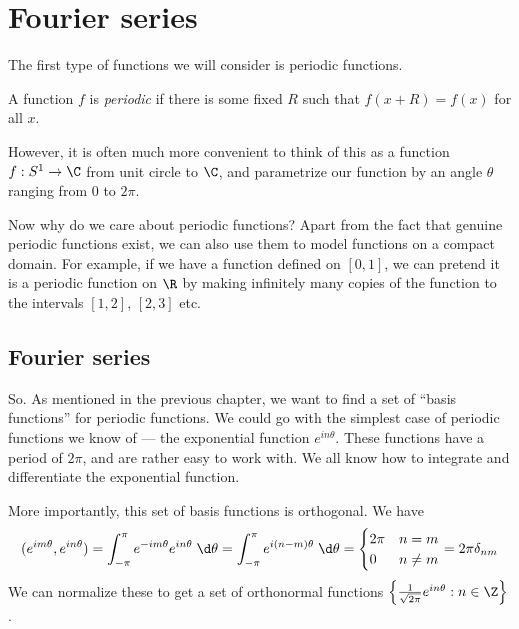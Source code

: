 \documentclass[a4paper]{article}
\begin{document}
\section{Fourier series}
The first type of functions we will consider is periodic functions.
\begin{defi}
  A function $f$ is \emph{periodic} if there is some fixed $R$ such that $f(x + R) = f(x)$ for all $x$.

  However, it is often much more convenient to think of this as a function $f: S^1 \to \C$ from unit circle to $\C$, and parametrize our function by an angle $\theta$ ranging from $0$ to $2\pi$.
\end{defi}
Now why do we care about periodic functions? Apart from the fact that genuine periodic functions exist, we can also use them to model functions on a compact domain. For example, if we have a function defined on $[0, 1]$, we can pretend it is a periodic function on $\R$ by making infinitely many copies of the function to the intervals $[1, 2]$, $[2, 3]$ etc.
\begin{center}
\end{center}
\subsection{Fourier series}
So. As mentioned in the previous chapter, we want to find a set of ``basis functions'' for periodic functions. We could go with the simplest case of periodic functions we know of --- the exponential function $e^{in\theta}$. These functions have a period of $2\pi$, and are rather easy to work with. We all know how to integrate and differentiate the exponential function.

More importantly, this set of basis functions is orthogonal. We have
\[
  (e^{im \theta}, e^{in\theta}) = \int_{-\pi}^{\pi} e^{-im\theta} e^{in\theta}\;\d \theta = \int_{-\pi}^\pi e^{i(n - m)\theta}\;\d \theta =
  \begin{cases}
    2\pi & n = m\\
    0 & n\not= m
  \end{cases} = 2\pi \delta_{nm}
\]
We can normalize these to get a set of orthonormal functions $\left\{\frac{1}{\sqrt{2\pi}} e^{in\theta}: n\in \Z\right\}$.
\end{document}

